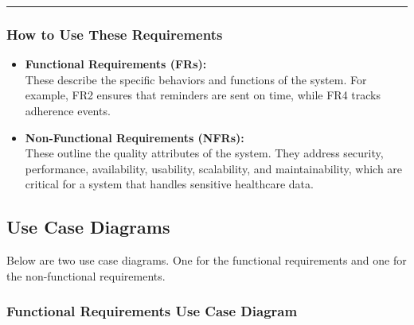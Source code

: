 \documentclass[
  12pt,
]{article}
\begin{document}
\begin{center}\rule{0.5\linewidth}{0.5pt}\end{center}

\subsubsection{How to Use These
Requirements}\label{how-to-use-these-requirements}

\begin{itemize}
\item
  \textbf{Functional Requirements (FRs):}\\
  These describe the specific behaviors and functions of the system. For
  example, FR2 ensures that reminders are sent on time, while FR4 tracks
  adherence events.
\item
  \textbf{Non-Functional Requirements (NFRs):}\\
  These outline the quality attributes of the system. They address
  security, performance, availability, usability, scalability, and
  maintainability, which are critical for a system that handles
  sensitive healthcare data.
\end{itemize}

\subsection{Use Case Diagrams}\label{use-case-diagrams}

Below are two use case diagrams. One for the functional requirements and
one for the non-functional requirements.

\subsubsection{Functional Requirements Use Case
Diagram}\label{functional-requirements-use-case-diagram}
\end{document}
